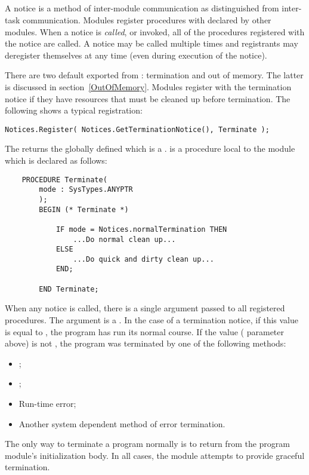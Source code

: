 \subsection{}
\label{Notices} 

A notice is a method of inter-module communication as distinguished
from inter-task communication.  Modules register procedures 
with  declared by other modules.  When a notice 
is {\em called}, or invoked, all of the procedures registered
with the notice are called.  A notice may be called multiple
times and registrants may deregister themselves at any time (even
during execution of the notice).  

There are two default  exported
from :
termination and out of memory. The latter is discussed in
section~\ref{OutOfMemory}.  Modules register with the termination
notice if they have resources that must be cleaned up before
termination.  The following shows a typical registration:
\begin{verbatim}
Notices.Register( Notices.GetTerminationNotice(), Terminate );
\end{verbatim}
The  returns the 
globally defined  which is
a .
 is a procedure local to the module which is
declared as follows:
\begin{verbatim}
    PROCEDURE Terminate(
        mode : SysTypes.ANYPTR
        );
        BEGIN (* Terminate *)

            IF mode = Notices.normalTermination THEN
                ...Do normal clean up...
            ELSE
                ...Do quick and dirty clean up...
            END;

        END Terminate;
\end{verbatim}

When any notice is called, there is a single argument passed to
all registered procedures.  The argument is a .
In the case of a termination notice, if this value is equal to
, the program
has run its normal course.  If the value ( parameter
above) is not , the program
was terminated by one of the following methods:
\begin{itemize}
\item
    ;
\item
    ;
\item
    Run-time error;
\item
    Another system dependent method of error termination.
\end{itemize}
The only way to terminate a program normally is to return
from the program module's initialization body.  
In all cases, the module  attempts to provide
graceful termination.


